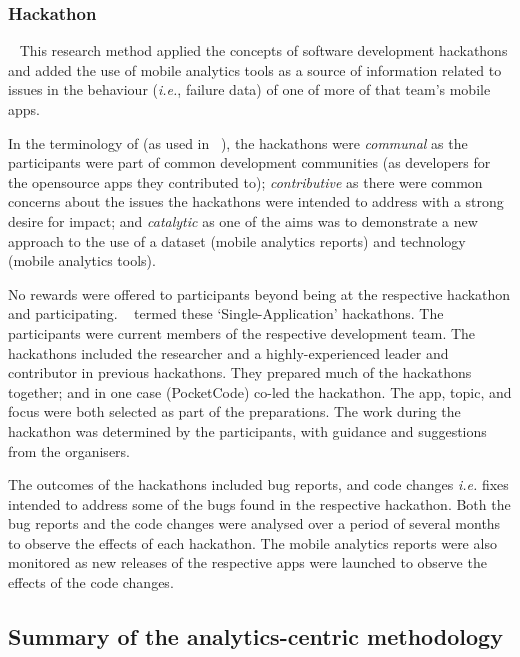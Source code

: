 \subsubsection{Hackathon}~\label{section-hackathon-research-method}
This research method applied the concepts of software development hackathons and added the use of mobile analytics tools as a source of information related to issues in the behaviour (\emph{i.e.}, failure data) of one of more of that team's mobile apps.

In the terminology of  (as used in ~), the hackathons were 
\emph{communal} as the participants were part of common development communities (as developers for the opensource apps they contributed to); \emph{contributive} as there were common concerns about the issues the hackathons were intended to address with a strong desire for impact; and \emph{catalytic} as one of the aims was to demonstrate a new approach to the use of a dataset (mobile analytics reports) and technology (mobile analytics tools).  

No rewards were offered to participants beyond being at the respective hackathon and participating. ~ termed these `Single-Application' hackathons. The participants were current members of the respective development team.  The hackathons included the researcher and a highly-experienced leader and contributor in previous hackathons. They prepared much of the hackathons together; and in one case (PocketCode) co-led the hackathon. The app, topic, and focus were both selected as part of the preparations. The work during the hackathon was determined by the participants, with guidance and suggestions from the organisers.


The outcomes of the hackathons included bug reports, and code changes \emph{i.e.} fixes intended to address some of the bugs found in the respective hackathon. Both the bug reports and the code changes were analysed over a period of several months to observe the effects of each hackathon. The mobile analytics reports were also monitored as new releases of the respective apps were launched to observe the effects of the code changes.

\subsection{Summary of the analytics-centric methodology}~\label{analytics-centric-methodology-section}

